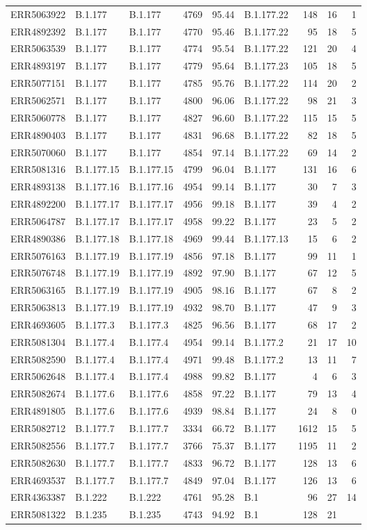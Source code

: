 \documentclass[
]{article}
\begin{document}
\begin{longtable}[]{@{}lllrrlrrr@{}}
ERR5063922 & B.1.177 & B.1.177 & 4769 & 95.44 & B.1.177.22 & 148 & 16 &
1\tabularnewline
ERR4892392 & B.1.177 & B.1.177 & 4770 & 95.46 & B.1.177.22 & 95 & 18 &
5\tabularnewline
ERR5063539 & B.1.177 & B.1.177 & 4774 & 95.54 & B.1.177.22 & 121 & 20 &
4\tabularnewline
ERR4893197 & B.1.177 & B.1.177 & 4779 & 95.64 & B.1.177.23 & 105 & 18 &
5\tabularnewline
ERR5077151 & B.1.177 & B.1.177 & 4785 & 95.76 & B.1.177.22 & 114 & 20 &
2\tabularnewline
ERR5062571 & B.1.177 & B.1.177 & 4800 & 96.06 & B.1.177.22 & 98 & 21 &
3\tabularnewline
ERR5060778 & B.1.177 & B.1.177 & 4827 & 96.60 & B.1.177.22 & 115 & 15 &
5\tabularnewline
ERR4890403 & B.1.177 & B.1.177 & 4831 & 96.68 & B.1.177.22 & 82 & 18 &
5\tabularnewline
ERR5070060 & B.1.177 & B.1.177 & 4854 & 97.14 & B.1.177.22 & 69 & 14 &
2\tabularnewline
ERR5081316 & B.1.177.15 & B.1.177.15 & 4799 & 96.04 & B.1.177 & 131 & 16
& 6\tabularnewline
ERR4893138 & B.1.177.16 & B.1.177.16 & 4954 & 99.14 & B.1.177 & 30 & 7 &
3\tabularnewline
ERR4892200 & B.1.177.17 & B.1.177.17 & 4956 & 99.18 & B.1.177 & 39 & 4 &
2\tabularnewline
ERR5064787 & B.1.177.17 & B.1.177.17 & 4958 & 99.22 & B.1.177 & 23 & 5 &
2\tabularnewline
ERR4890386 & B.1.177.18 & B.1.177.18 & 4969 & 99.44 & B.1.177.13 & 15 &
6 & 2\tabularnewline
ERR5076163 & B.1.177.19 & B.1.177.19 & 4856 & 97.18 & B.1.177 & 99 & 11
& 1\tabularnewline
ERR5076748 & B.1.177.19 & B.1.177.19 & 4892 & 97.90 & B.1.177 & 67 & 12
& 5\tabularnewline
ERR5063165 & B.1.177.19 & B.1.177.19 & 4905 & 98.16 & B.1.177 & 67 & 8 &
2\tabularnewline
ERR5063813 & B.1.177.19 & B.1.177.19 & 4932 & 98.70 & B.1.177 & 47 & 9 &
3\tabularnewline
ERR4693605 & B.1.177.3 & B.1.177.3 & 4825 & 96.56 & B.1.177 & 68 & 17 &
2\tabularnewline
ERR5081304 & B.1.177.4 & B.1.177.4 & 4954 & 99.14 & B.1.177.2 & 21 & 17
& 10\tabularnewline
ERR5082590 & B.1.177.4 & B.1.177.4 & 4971 & 99.48 & B.1.177.2 & 13 & 11
& 7\tabularnewline
ERR5062648 & B.1.177.4 & B.1.177.4 & 4988 & 99.82 & B.1.177 & 4 & 6 &
3\tabularnewline
ERR5082674 & B.1.177.6 & B.1.177.6 & 4858 & 97.22 & B.1.177 & 79 & 13 &
4\tabularnewline
ERR4891805 & B.1.177.6 & B.1.177.6 & 4939 & 98.84 & B.1.177 & 24 & 8 &
0\tabularnewline
ERR5082712 & B.1.177.7 & B.1.177.7 & 3334 & 66.72 & B.1.177 & 1612 & 15
& 5\tabularnewline
ERR5082556 & B.1.177.7 & B.1.177.7 & 3766 & 75.37 & B.1.177 & 1195 & 11
& 2\tabularnewline
ERR5082630 & B.1.177.7 & B.1.177.7 & 4833 & 96.72 & B.1.177 & 128 & 13 &
6\tabularnewline
ERR4693537 & B.1.177.7 & B.1.177.7 & 4849 & 97.04 & B.1.177 & 126 & 13 &
6\tabularnewline
ERR4363387 & B.1.222 & B.1.222 & 4761 & 95.28 & B.1 & 96 & 27 &
14\tabularnewline
ERR5081322 & B.1.235 & B.1.235 & 4743 & 94.92 & B.1 & 128 & 21 &

\end{longtable}
\end{document}
